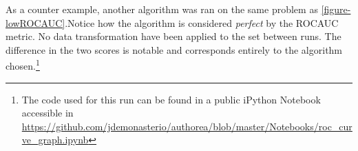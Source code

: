 As a counter example, another algorithm was ran on the same problem as \ref{figure-lowROCAUC}.Notice how the algorithm is considered \textit{perfect} by the ROCAUC metric. No data transformation have been applied to the set between runs. The difference in the two scores is notable and corresponds entirely to the algorithm chosen.\footnote{The code used for this run can be found in a public iPython Notebook accessible in \url{https://github.com/jdemonasterio/authorea/blob/master/Notebooks/roc_curve_graph.ipynb}}